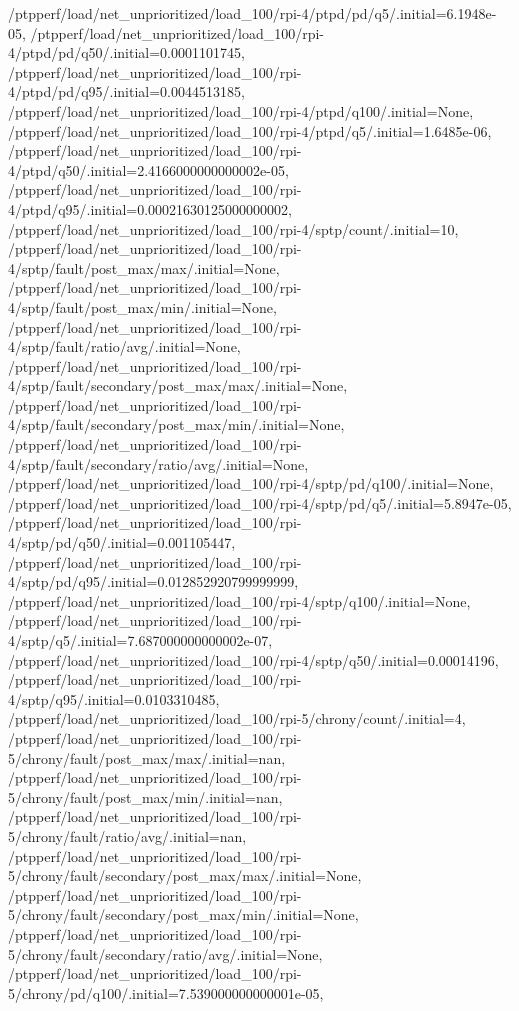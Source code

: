 {    /ptpperf/load/net_unprioritized/load_100/rpi-4/ptpd/pd/q5/.initial=6.1948e-05,
    /ptpperf/load/net_unprioritized/load_100/rpi-4/ptpd/pd/q50/.initial=0.0001101745,
    /ptpperf/load/net_unprioritized/load_100/rpi-4/ptpd/pd/q95/.initial=0.0044513185,
    /ptpperf/load/net_unprioritized/load_100/rpi-4/ptpd/q100/.initial=None,
    /ptpperf/load/net_unprioritized/load_100/rpi-4/ptpd/q5/.initial=1.6485e-06,
    /ptpperf/load/net_unprioritized/load_100/rpi-4/ptpd/q50/.initial=2.4166000000000002e-05,
    /ptpperf/load/net_unprioritized/load_100/rpi-4/ptpd/q95/.initial=0.00021630125000000002,
    /ptpperf/load/net_unprioritized/load_100/rpi-4/sptp/count/.initial=10,
    /ptpperf/load/net_unprioritized/load_100/rpi-4/sptp/fault/post_max/max/.initial=None,
    /ptpperf/load/net_unprioritized/load_100/rpi-4/sptp/fault/post_max/min/.initial=None,
    /ptpperf/load/net_unprioritized/load_100/rpi-4/sptp/fault/ratio/avg/.initial=None,
    /ptpperf/load/net_unprioritized/load_100/rpi-4/sptp/fault/secondary/post_max/max/.initial=None,
    /ptpperf/load/net_unprioritized/load_100/rpi-4/sptp/fault/secondary/post_max/min/.initial=None,
    /ptpperf/load/net_unprioritized/load_100/rpi-4/sptp/fault/secondary/ratio/avg/.initial=None,
    /ptpperf/load/net_unprioritized/load_100/rpi-4/sptp/pd/q100/.initial=None,
    /ptpperf/load/net_unprioritized/load_100/rpi-4/sptp/pd/q5/.initial=5.8947e-05,
    /ptpperf/load/net_unprioritized/load_100/rpi-4/sptp/pd/q50/.initial=0.001105447,
    /ptpperf/load/net_unprioritized/load_100/rpi-4/sptp/pd/q95/.initial=0.012852920799999999,
    /ptpperf/load/net_unprioritized/load_100/rpi-4/sptp/q100/.initial=None,
    /ptpperf/load/net_unprioritized/load_100/rpi-4/sptp/q5/.initial=7.687000000000002e-07,
    /ptpperf/load/net_unprioritized/load_100/rpi-4/sptp/q50/.initial=0.00014196,
    /ptpperf/load/net_unprioritized/load_100/rpi-4/sptp/q95/.initial=0.0103310485,
    /ptpperf/load/net_unprioritized/load_100/rpi-5/chrony/count/.initial=4,
    /ptpperf/load/net_unprioritized/load_100/rpi-5/chrony/fault/post_max/max/.initial=nan,
    /ptpperf/load/net_unprioritized/load_100/rpi-5/chrony/fault/post_max/min/.initial=nan,
    /ptpperf/load/net_unprioritized/load_100/rpi-5/chrony/fault/ratio/avg/.initial=nan,
    /ptpperf/load/net_unprioritized/load_100/rpi-5/chrony/fault/secondary/post_max/max/.initial=None,
    /ptpperf/load/net_unprioritized/load_100/rpi-5/chrony/fault/secondary/post_max/min/.initial=None,
    /ptpperf/load/net_unprioritized/load_100/rpi-5/chrony/fault/secondary/ratio/avg/.initial=None,
    /ptpperf/load/net_unprioritized/load_100/rpi-5/chrony/pd/q100/.initial=7.539000000000001e-05,
}
